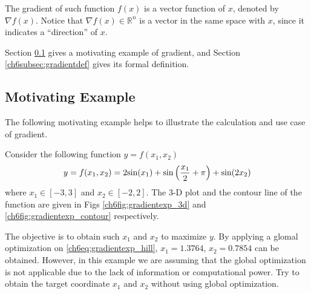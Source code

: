 The gradient of such function $f(x)$ is a vector function of $x$, denoted by $\nabla f(x)$. Notice that $\nabla f(x) \in \mathbb{R}^n$ is a vector in the same space with $x$, since it indicates a ``direction'' of $x$.

Section \ref{ch6subsec:gradientmotivatingexp} gives a motivating example of gradient, and Section \ref{ch6subsec:gradientdef} gives its formal definition.

\subsection{Motivating Example} \label{ch6subsec:gradientmotivatingexp}

The following motivating example helps to illustrate the calculation and use case of gradient.

\begin{shortbox}

Consider the following function $y=f(x_1,x_2)$
\begin{eqnarray}
    y = f(x_1,x_2) = 2\textup{sin}(x_1) + \textup{sin}\left(\dfrac{x_1}{2} + \pi\right) + \textup{sin}(2x_2) \label{ch6eq:gradientexp_hill}
\end{eqnarray}
where $x_1\in[-3,3]$ and $x_2\in[-2,2]$. The 3-D plot and the contour line of the function are given in Figs \ref{ch6fig:gradientexp_3d} and \ref{ch6fig:gradientexp_contour} respectively.

The objective is to obtain such $x_1$ and $x_2$ to maximize $y$. By applying a glomal optimization on \eqref{ch6eq:gradientexp_hill}, $x_1 = 1.3764$, $x_2=0.7854$ can be obtained. However, in this example we are assuming that the global optimization is not applicable due to the lack of information or computational power. Try to obtain the target coordinate $x_1$ and $x_2$ without using global optimization.

\end{shortbox}

